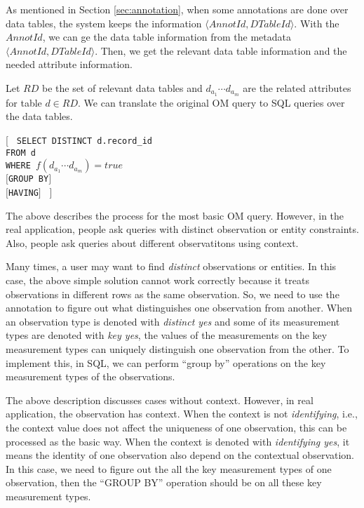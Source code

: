 \documentclass[conference]{IEEEtran}
\begin{document}
As mentioned in Section \ref{sec:annotation}, when some annotations are done over data tables, the system keeps the
information $\langle AnnotId, DTableId\rangle$. 
With the $AnnotId$, we can ge the data table information from the
metadata  $\langle AnnotId, DTableId\rangle$. 
Then, we get the relevant data table information and the needed attribute
information.

Let $RD$ be the set of relevant data tables and $d_{a_1} \cdots d_{a_m}$
are the related attributes for table $d\in RD$. We can translate the original OM query to SQL queries
over the data tables.  

[
{\tt 
SELECT DISTINCT d.record\_id\\
FROM d\\
WHERE $f(d_{a_1} \cdots d_{a_m}) = true$\\
$[$GROUP BY$]$\\
$[$HAVING$]$
}
]

The above describes the process for the most basic OM query. 
However, in the real application, people ask queries with distinct
observation or entity constraints. Also, people ask queries about
different observatitons using context. 

Many times, a user may want to find {\em distinct} observations or
entities. In this case, the above simple solution cannot work
correctly because it treats observations in different rows as the same
observation. So, we need to use the annotation to figure out what
distinguishes one observation from another. 
When an observation type is denoted with {\em distinct yes} and some
of its measurement types are denoted with {\em key yes}, 
the values of the measurements on the key measurement types can
uniquely distinguish one observation from the other. 
To implement this, in SQL, we can perform ``group by'' operations on
the key measurement types of the observations. 

The above description discusses cases without context. 
However, in real application, the observation has context. 
When the context is not {\em identifying}, i.e., the context value
does not affect the uniqueness of one observation, this can be
processed as the basic way. 
When the context is denoted with {\em identifying yes}, it means the
identity of one observation also depend on the contextual
observation. 
In this case, we need to figure out the all the key measurement types
of one observation, then the ``GROUP BY'' operation should be on all
these key measurement types. 
\end{document}
